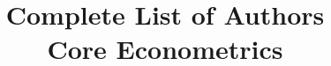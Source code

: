 \documentclass[nohyper]{tufte-handout}
\title[Complete list of authors]%
{Complete List of Authors \\
  Core Econometrics}
\begin{document}
\maketitle
\bigskip

\end{document}
